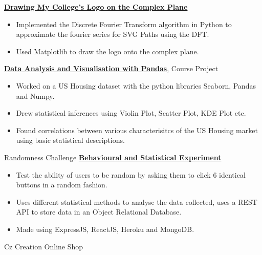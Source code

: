 {}
{\href{https://confumbit.github.io/posts/kmc-logo.html}{\textbf{Drawing My College's Logo on the Complex Plane}}}
{
    \begin{itemize}
        \item Implemented the Discrete Fourier Transform algorithm in Python to approximate the fourier series for SVG Paths using the DFT.
        \item Used Matplotlib to draw the logo onto the complex plane.
    \end{itemize}
}
%
%
{}
{\href{https://drive.google.com/file/d/1EF9wtUCJqQINYWiY4uFL4mmktJBL6r1b/view?usp=sharing}{\textbf{Data Analysis and Visualisation with Pandas}}, Course Project}
{
    \begin{itemize}
        \item Worked on a US Housing dataset with the python libraries Seaborn, Pandas and Numpy.
        \item Drew statistical inferences using Violin Plot, Scatter Plot, KDE Plot etc.
        \item Found correlations between various characterisitcs of the US Housing market using basic statistical descriptions.
    \end{itemize}
}
%
%
%
%
{Randomness Challenge}
{\href{https://randomnesschallenge-71zq.onrender.com/}{\textbf{Behavioural and Statistical Experiment}}}
{
    \begin{itemize}
        \item Test the ability of users to be random by asking them to click 6 identical buttons in a random fashion.
        \item Uses different statistical methods to analyse the data collected, uses a REST API to store data in an Object Relational Database.
        \item Made using ExpressJS, ReactJS, Heroku and MongoDB.
    \end{itemize}
}
%
%
{Cz Creation Online Shop}
